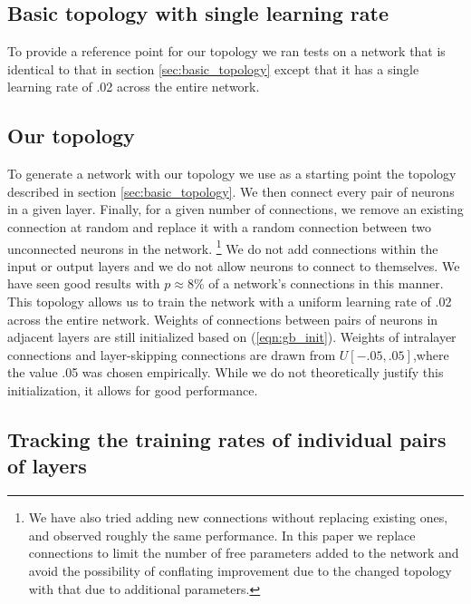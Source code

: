 \documentclass{article}
\newcommand{\npar}{\\\indent}
\begin{document}
\subsection{Basic topology with single learning rate}
\label{sec:basic_topology_uniform}

To provide a reference point for our topology we ran tests on a network that is identical to that in section \ref{sec:basic_topology} except that it has a single learning rate of .02 across the entire network.

\subsection{Our topology}
\label{sec:our_topology}

To generate a network with our topology we use as a starting point the topology described in section \ref{sec:basic_topology}. We then connect every pair of neurons in a given layer. Finally, for a given number of connections, we remove an existing connection at random and replace it with a random connection between two unconnected neurons in the network. \footnote{We have also tried adding new connections without replacing existing ones, and observed roughly the same performance. In this paper we replace connections to limit the number of free parameters added to the network and avoid the possibility of conflating improvement due to the changed topology with that due to additional parameters.} We do not add connections within the input or output layers and we do not allow neurons to connect to themselves. We have seen good results with $p\approx 8\%$ of a network's connections in this manner.
\npar
This topology allows us to train the network with a uniform learning rate of .02 across the entire network. Weights of connections between pairs of neurons in adjacent layers are still initialized based on (\ref{eqn:gb_init}). Weights of intralayer connections and layer-skipping connections are drawn from $U[-.05,.05]$,where the value .05 was chosen empirically. While we do not theoretically justify this initialization, it allows for good performance.

\subsection{Tracking the training rates of individual pairs of layers}
\end{document}
